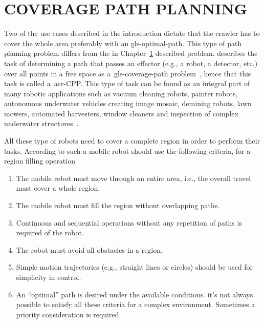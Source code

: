 \section{COVERAGE PATH PLANNING}\label{sec:cpp}
Two of the use cases described in the introduction dictate that the crawler has to cover the whole area preferably with
an \gls{gls-optimal-path}. This type of path planning problem differs from the in Chapter~\ref{sec:cpp} described
problem. \citeauthor{choset_principles_2005} describes the task of determining a path that passes an effector (e.g., a
robot, a detector, etc.) over all points in a free space as a~\gls{gls-coverage-path}
problem~\cite{choset_principles_2005}, hence that this task is called a~\gls{acr-CPP}. This type of task can be
found as an integral part of many robotic applications such as vacuum cleaning robots, painter robots, autonomous
underwater vehicles creating image mosaic, demining robots, lawn mowers, automated harvesters, window cleaners and
inspection of complex underwater structures~\cite{galceran_survey_2013}.

All these type of robots need to cover a complete region in order to perform their tasks. According to
\citet{cao_region_1988} such a mobile robot should use the following criteria, for a region filling operation
\begin{enumerate}
	\setlength\itemsep{0mm}
	\item The mobile robot must move through an entire area, i.e., the overall travel must cover a whole region.
	\item The mobile robot must fill the region without overlapping paths.
	\item Continuous and sequential operations without any repetition of paths is required of the robot.
	\item The robot must avoid all obstacles in a region.
	\item Simple motion trajectories (e.g., straight lines or circles) should be used for simplicity in control.
	\item An ``optimal'' path is desired under the available conditions. it's not always possible to satisfy all these
	criteria for a complex environment. Sometimes a priority consideration is required.
\end{enumerate}

